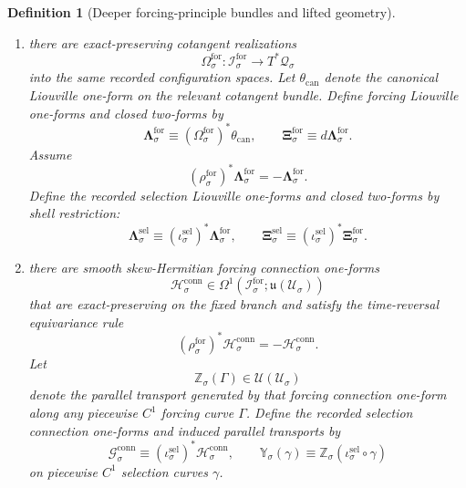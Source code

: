 \documentclass[11pt]{article}
\newcommand{\LieU}{\mathfrak u}
\newcommand{\RootClass}[1]{\mathscr U_{#1}}
\newcommand{\ConfigSpace}[1]{\mathcal Q_{#1}}
\newcommand{\ShellGap}[1]{\eta_{#1}}
\newcommand{\ConstraintGap}[1]{\delta_{#1}}
\newcommand{\OriginGap}[1]{\epsilon_{#1}^{\mathrm{orig}}}
\newcommand{\SelSpace}[1]{\mathcal M_{#1}^{\mathrm{sel}}}
\newcommand{\SelInc}[1]{\iota_{#1}^{\mathrm{sel}}}
\newcommand{\SelLiftedAmbient}[1]{\overline{\mathfrak S}_{#1}^{\mathrm{sel}}}
\newcommand{\SelLiftedShell}[1]{\overline{\mathfrak D}_{#1}^{\mathrm{sel}}}
\newcommand{\SelConstraintMap}[1]{\overline{\mathfrak C}_{#1}^{\mathrm{sel}}}
\newcommand{\SelLiouville}[1]{\boldsymbol{\Lambda}_{#1}^{\mathrm{sel}}}
\newcommand{\SelTwo}[1]{\boldsymbol{\Xi}_{#1}^{\mathrm{sel}}}
\newcommand{\SelConnectionForm}[1]{\mathcal G_{#1}^{\mathrm{conn}}}
\newcommand{\SelTransport}[1]{\mathbb Y_{#1}}
\newcommand{\ForSpace}[1]{\mathcal I_{#1}^{\mathrm{for}}}
\newcommand{\ForTimeRev}[1]{\rho_{#1}^{\mathrm{for}}}
\newcommand{\ForLiftedAmbient}[1]{\underline{\mathfrak S}_{#1}^{\mathrm{for}}}
\newcommand{\ForLiftedShell}[1]{\underline{\mathfrak D}_{#1}^{\mathrm{for}}}
\newcommand{\ForConstraintMap}[1]{\underline{\mathfrak C}_{#1}^{\mathrm{for}}}
\newcommand{\ForCotangentRealization}[1]{\Omega_{#1}^{\mathrm{for}}}
\newcommand{\ForLiouville}[1]{\boldsymbol{\Lambda}_{#1}^{\mathrm{for}}}
\newcommand{\ForTwo}[1]{\boldsymbol{\Xi}_{#1}^{\mathrm{for}}}
\newcommand{\ForConnectionForm}[1]{\mathcal H_{#1}^{\mathrm{conn}}}
\newcommand{\ForTransport}[1]{\mathbb Z_{#1}}
\newtheorem{definition}{Definition}
\begin{document}
\begin{definition}[Deeper forcing-principle bundles and lifted geometry]
\begin{enumerate}
\[    \]
    preserved by the corresponding forcing time reversals and vanishing on the corresponding forcing unit sections. Define the recorded lifted maps by shell restriction:
    \begin{equation}
    \SelLiftedAmbient{\sigma}\equiv \ForLiftedAmbient{\sigma}|_{\SelSpace{\sigma}},\qquad
    \SelLiftedShell{\sigma}\equiv \ForLiftedShell{\sigma}|_{\SelSpace{\sigma}},\qquad
    \SelConstraintMap{\sigma}\equiv \ForConstraintMap{\sigma}|_{\SelSpace{\sigma}}.
    \label{eq:selection_remaining_lifts_from_forcing}
    \end{equation}
    Assume these restricted maps satisfy the same recorded ambient, shell, and exact-constraint gap data \(\OriginGap{\sigma},\ShellGap{\sigma},\ConstraintGap{\sigma}\).
    \item there are exact-preserving cotangent realizations
    \[
    \ForCotangentRealization{\sigma}:\ForSpace{\sigma}\to T^*\ConfigSpace{\sigma}
    \]
    into the same recorded configuration spaces. Let \(\theta_{\mathrm{can}}\) denote the canonical Liouville one-form on the relevant cotangent bundle. Define forcing Liouville one-forms and closed two-forms by
    \begin{equation}
    \ForLiouville{\sigma}\equiv (\ForCotangentRealization{\sigma})^*\theta_{\mathrm{can}},
    \qquad
    \ForTwo{\sigma}\equiv d\ForLiouville{\sigma}.
    \label{eq:forcing_liouville}
    \end{equation}
    Assume
    \[
    (\ForTimeRev{\sigma})^*\ForLiouville{\sigma}=-\ForLiouville{\sigma}.
    \]
    Define the recorded selection Liouville one-forms and closed two-forms by shell restriction:
    \begin{equation}
    \SelLiouville{\sigma}\equiv (\SelInc{\sigma})^*\ForLiouville{\sigma},
    \qquad
    \SelTwo{\sigma}\equiv (\SelInc{\sigma})^*\ForTwo{\sigma}.
    \label{eq:selection_liouville_from_forcing}
    \end{equation}
    \item there are smooth skew-Hermitian forcing connection one-forms
    \[
    \ForConnectionForm{\sigma}\in \Omega^1(\ForSpace{\sigma};\LieU(\RootClass{\sigma}))
    \]
    that are exact-preserving on the fixed branch and satisfy the time-reversal equivariance rule
    \[
    (\ForTimeRev{\sigma})^*\ForConnectionForm{\sigma}=-\ForConnectionForm{\sigma}.
    \]
    Let
    \[
    \ForTransport{\sigma}(\Gamma)\in \mathcal U(\RootClass{\sigma})
    \]
    denote the parallel transport generated by that forcing connection one-form along any piecewise \(C^1\) forcing curve \(\Gamma\). Define the recorded selection connection one-forms and induced parallel transports by
    \begin{equation}
    \SelConnectionForm{\sigma}\equiv (\SelInc{\sigma})^*\ForConnectionForm{\sigma},
    \qquad
    \SelTransport{\sigma}(\gamma)\equiv \ForTransport{\sigma}(\SelInc{\sigma}\circ\gamma)
    \label{eq:selection_connection_from_forcing}
    \end{equation}
    on piecewise \(C^1\) selection curves \(\gamma\).
\end{enumerate}


\end{definition}
\end{document}
